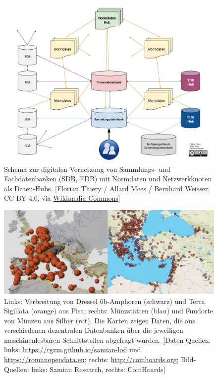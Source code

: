 \documentclass[9pt,academicons]{article}
\begin{document}
\begin{figure}[ht]
 \begin{center}
  \includegraphics[scale=0.6]{img/Sammlungsdatenbankennetzwerk.png}
  \caption{Schema zur digitalen Vernetzung von Sammlungs- und Fachdatenbanken (SDB, FDB) mit Normdaten und Netzwerkknoten als Daten-Hubs. [Florian Thiery / Allard Mees / Bernhard Weisser, CC BY 4.0, via \href{https://commons.wikimedia.org/wiki/File:Sammlungsdatenbankennetzwerk.png}{Wikimedia Commons}]}
  \label{fig:network}
 \end{center}
\end{figure}

\begin{figure}
 \begin{center}
  \includegraphics[scale=0.75]{img/map.pdf}
  \caption{Links: Verbreitung von Dressel 6b-Amphoren (schwarz) und Terra Sigillata (orange) aus Pisa; rechts: Münzstätten (blau) und Fundorte von Münzen aus Silber (rot). Die Karten zeigen Daten, die aus verschiedenen dezentralen Datenbanken über die jeweiligen  maschinenlesbaren Schnittstellen abgefragt wurden. [Daten-Quellen: links: \url{https://rgzm.github.io/samian-lod} und \url{https://romanopendata.eu}; rechts: \url{http://coinhoards.org}; Bild-Quellen: links: Samian Research, rechts: CoinHoards]}
  \label{fig:network}
 \end{center}
\end{figure}

\bigskip
\end{document}
